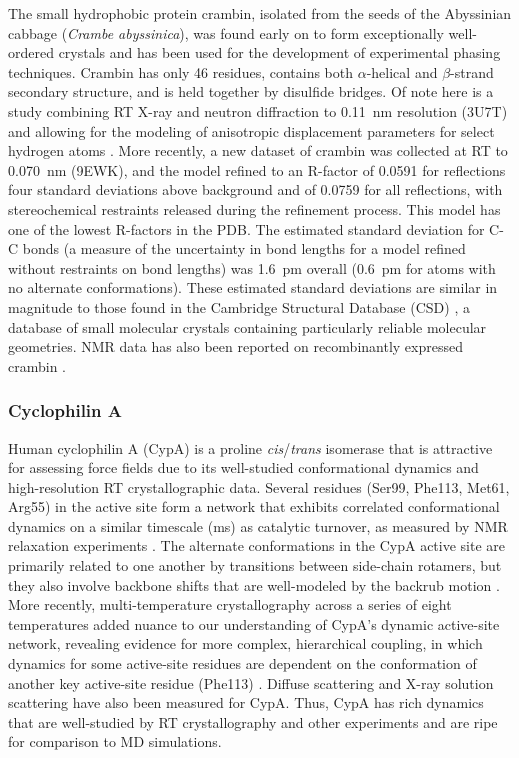 \documentclass[9pt,review]{livecoms}
\begin{document}
The small hydrophobic protein crambin, isolated from the seeds of the Abyssinian cabbage (\textit{Crambe abyssinica}), was found early on to form exceptionally well-ordered crystals \cite{teeter_water_1984} and has been used for the development of experimental phasing techniques.
Crambin has only 46 residues, contains both $\alpha$-helical and $\beta$-strand secondary structure, and is held together by disulfide bridges.
Of note here is a study combining RT X-ray and neutron diffraction to \qty{0.11}{\nano\meter} resolution (3U7T) and allowing for the modeling of anisotropic displacement parameters for select hydrogen atoms \cite{chen_room-temperature_2012}.
More recently, a new dataset of crambin was collected at RT to \qty{0.070}{\nano\meter} (9EWK), and the model refined to an R-factor of 0.0591 for reflections four standard deviations above background and of 0.0759 for all reflections, with stereochemical restraints released during the refinement process.
This model has one of the lowest R-factors in the PDB.
The estimated standard deviation for C-C bonds (a measure of the uncertainty in bond lengths for a model refined without restraints on bond lengths) was \qty{1.6}{\pico\meter} overall (\qty{0.6}{\pico\meter} for atoms with no alternate conformations).
These estimated standard deviations are similar in magnitude to those found in the Cambridge Structural Database (CSD) \cite{groom_cambridge_2016}, a database of small molecular crystals containing particularly reliable molecular geometries. 
NMR data has also been reported on recombinantly expressed crambin \cite{ahn_three-dimensional_2006}.

\subsubsection{Cyclophilin A}
\label{sub2:cypa}

Human cyclophilin A (CypA) is a proline \textit{cis}/\textit{trans} isomerase that is attractive for assessing force fields due to its well-studied conformational dynamics and high-resolution RT crystallographic data.
Several residues (Ser99, Phe113, Met61, Arg55) in the active site form a network that exhibits correlated conformational dynamics on a similar timescale (ms) as catalytic turnover, as measured by NMR relaxation experiments \cite{eisenmesser_intrinsic_2005}.
The alternate conformations in the CypA active site are primarily related to one another by transitions between side-chain rotamers, but they also involve backbone shifts that are well-modeled by the backrub motion \cite{davis_backrub_2006,friedland_simple_2008}.
More recently, multi-temperature crystallography across a series of eight temperatures added nuance to our understanding of CypA’s dynamic active-site network, revealing evidence for more complex, hierarchical coupling, in which dynamics for some active-site residues are dependent on the conformation of another key active-site residue (Phe113) \cite{keedy_mapping_2015}.
Diffuse scattering \cite{van_benschoten_measuring_2016} and X-ray solution scattering \cite{thompson_temperature-jump_2019,chen_solvent_2024} have also been measured for CypA.
Thus, CypA has rich dynamics that are well-studied by RT crystallography and other experiments and are ripe for comparison to MD simulations.
\end{document}
